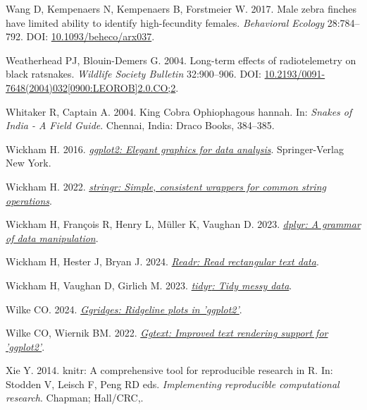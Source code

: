 \documentclass[10pt,a4paper]{article}
\newlength{\cslhangindent}
\newenvironment{CSLReferences}[2] %
 {\begin{list}{}{%
  \setlength{\itemindent}{0pt}
  \setlength{\leftmargin}{0pt}
  \setlength{\parsep}{0pt}
  \ifodd #1
   \setlength{\leftmargin}{\cslhangindent}
   \setlength{\itemindent}{-1\cslhangindent}
  \fi
  \setlength{\itemsep}{#2\baselineskip}}}
 {\end{list}}
\begin{document}
\begin{CSLReferences}{1}{0}
Wang D, Kempenaers N, Kempenaers B, Forstmeier W. 2017. Male zebra finches have limited ability to identify high-fecundity females. \emph{Behavioral Ecology} 28:784--792. DOI: \href{https://doi.org/10.1093/beheco/arx037}{10.1093/beheco/arx037}.

Weatherhead PJ, Blouin-Demers G. 2004. Long-term effects of radiotelemetry on black ratsnakes. \emph{Wildlife Society Bulletin} 32:900--906. DOI: \href{https://doi.org/10.2193/0091-7648(2004)032\%5B0900:LEOROB\%5D2.0.CO;2}{10.2193/0091-7648(2004)032{[}0900:LEOROB{]}2.0.CO;2}.

Whitaker R, Captain A. 2004. King {Cobra} {Ophiophagous} hannah. In: \emph{Snakes of {India} - {A} {Field} {Guide}}. Chennai, India: Draco Books, 384--385.

Wickham H. 2016. \emph{\href{https://ggplot2.tidyverse.org}{ggplot2: Elegant graphics for data analysis}}. Springer-Verlag New York.

Wickham H. 2022. \emph{\href{https://CRAN.R-project.org/package=stringr}{{stringr}: Simple, consistent wrappers for common string operations}}.

Wickham H, François R, Henry L, Müller K, Vaughan D. 2023. \emph{\href{https://CRAN.R-project.org/package=dplyr}{{dplyr}: A grammar of data manipulation}}.

Wickham H, Hester J, Bryan J. 2024. \emph{\href{https://CRAN.R-project.org/package=readr}{Readr: Read rectangular text data}}.

Wickham H, Vaughan D, Girlich M. 2023. \emph{\href{https://CRAN.R-project.org/package=tidyr}{{tidyr}: Tidy messy data}}.

Wilke CO. 2024. \emph{\href{https://CRAN.R-project.org/package=ggridges}{Ggridges: Ridgeline plots in 'ggplot2'}}.

Wilke CO, Wiernik BM. 2022. \emph{\href{https://CRAN.R-project.org/package=ggtext}{Ggtext: Improved text rendering support for 'ggplot2'}}.

Xie Y. 2014. {knitr}: A comprehensive tool for reproducible research in {R}. In: Stodden V, Leisch F, Peng RD eds. \emph{Implementing reproducible computational research}. Chapman; Hall/CRC,.


\end{CSLReferences}
\end{document}
